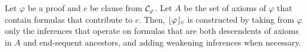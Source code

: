 

\begin{definition} %
\label{definition:OProjection}
Let $\varphi$ be a proof and $c$ be clause from $\mathcal{C}_{\varphi}$. Let $A$ be the set of axioms of $\varphi$ that contain formulas that contribute to $c$. Then, $\lfloor \varphi \rfloor_{c}$ is constructed by taking from $\varphi$ only the inferences that operate on formulas that are both descendents of axioms in $A$ and end-sequent ancestors, and adding weakening inferences when necessary.
\end{definition}

